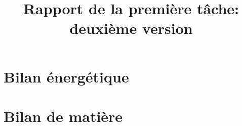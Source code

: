 
\title{Rapport de la première tâche: deuxième version}

\maketitle
\newpage
\chapter{Bilan énergétique}

\clearpage
\chapter{Bilan de matière}

